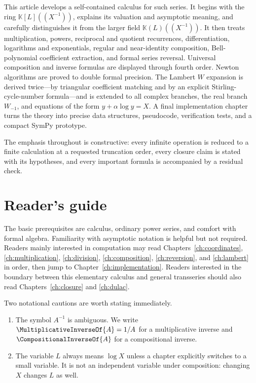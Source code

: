\documentclass[11pt,openany]{book}
\theoremstyle{definition}
\theoremstyle{plain}
\theoremstyle{remark}
\newcommand{\K}{\mathbb{K}}
\newcommand{\rev}[1]{\CompositionalInverseOf{#1}}
\newcommand{\recip}[1]{\MultiplicativeInverseOf{#1}}
\begin{document}
This article develops a self-contained calculus for such series.  It begins
with the ring \(\K[L]((X^{-1}))\), explains its valuation and asymptotic meaning,
and carefully distinguishes it from the larger field
\(\K(L)((X^{-1}))\).  It then treats multiplication, powers, reciprocal and
quotient recurrences, differentiation, logarithms and exponentials, regular and
near-identity composition, Bell-polynomial coefficient extraction, and formal
series reversal.  Universal composition and inverse formulas are displayed
through fourth order.  Newton algorithms are proved to double formal precision.
The Lambert \(W\) expansion is derived twice---by triangular coefficient
matching and by an explicit Stirling-cycle-number formula---and is extended to
all complex branches, the real branch \(W_{-1}\), and equations of the form
\(y+\alpha\log y=X\).  A final implementation chapter turns the theory into
precise data structures, pseudocode, verification tests, and a compact SymPy
prototype.

The emphasis throughout is constructive: every infinite operation is reduced
to a finite calculation at a requested truncation order, every closure claim is
stated with its hypotheses, and every important formula is accompanied by a
residual check.

\chapter*{Reader's guide}
The basic prerequisites are calculus, ordinary power series, and comfort with
formal algebra.  Familiarity with asymptotic notation is helpful but not
required.  Readers mainly interested in computation may read
Chapters~\ref{ch:coordinates}, \ref{ch:multiplication}, \ref{ch:division},
\ref{ch:composition}, \ref{ch:reversion}, and \ref{ch:lambert} in order, then
jump to Chapter~\ref{ch:implementation}.  Readers interested in the boundary
between this elementary calculus and general transseries should also read
Chapters~\ref{ch:closure} and \ref{ch:dulac}.

Two notational cautions are worth stating immediately.
\begin{enumerate}
\item The symbol \(A^{-1}\) is ambiguous.  We write \(\recip{A}=1/A\) for a
multiplicative inverse and \(\rev{A}\) for a compositional inverse.
\item The variable \(L\) always means \(\log X\) unless a chapter explicitly
switches to a small variable.  It is not an independent variable under
composition: changing \(X\) changes \(L\) as well.
\end{enumerate}
\end{document}
